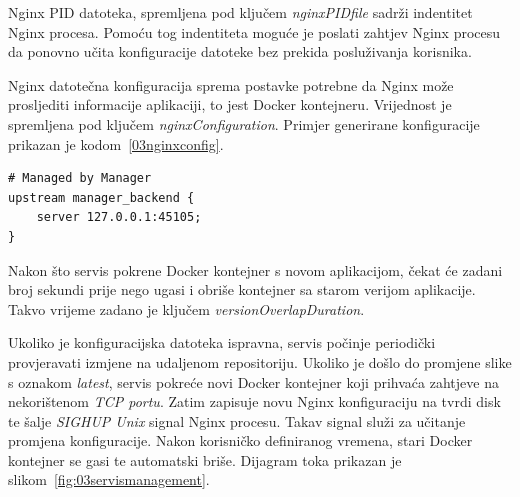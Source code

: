 Nginx PID datoteka, spremljena pod ključem \textit{nginxPIDfile} sadrži indentitet Nginx procesa.
Pomoću tog indentiteta moguće je poslati zahtjev Nginx procesu da ponovno učita konfiguracije
datoteke bez prekida posluživanja korisnika.

Nginx datotečna konfiguracija sprema postavke potrebne da Nginx može prosljediti informacije
aplikaciji, to jest Docker kontejneru. Vrijednost je spremljena pod ključem
\textit{nginxConfiguration}. Primjer generirane konfiguracije prikazan je
kodom~\ref{03nginxconfig}.

\begin{lstlisting}[float=h]
# Managed by Manager
upstream manager_backend {
    server 127.0.0.1:45105;
}
\end{lstlisting}

Nakon što servis pokrene Docker kontejner s novom aplikacijom, čekat će zadani broj sekundi prije
nego ugasi i obriše kontejner sa starom verijom aplikacije. Takvo vrijeme zadano je ključem
\textit{versionOverlapDuration}.

Ukoliko je konfiguracijska datoteka ispravna, servis počinje periodički provjeravati izmjene na
udaljenom repositoriju. Ukoliko je došlo do promjene slike s oznakom \textit{latest}, servis pokreće
novi Docker kontejner koji prihvaća zahtjeve na nekorištenom \textit{TCP portu}. Zatim zapisuje novu
Nginx konfiguraciju na tvrdi disk te šalje \textit{SIGHUP Unix} signal Nginx procesu. Takav signal
služi za učitanje promjena konfiguracije. Nakon korisničko definiranog vremena, stari Docker
kontejner se gasi te automatski briše. Dijagram toka prikazan je
slikom~\ref{fig:03servismanagement}.

